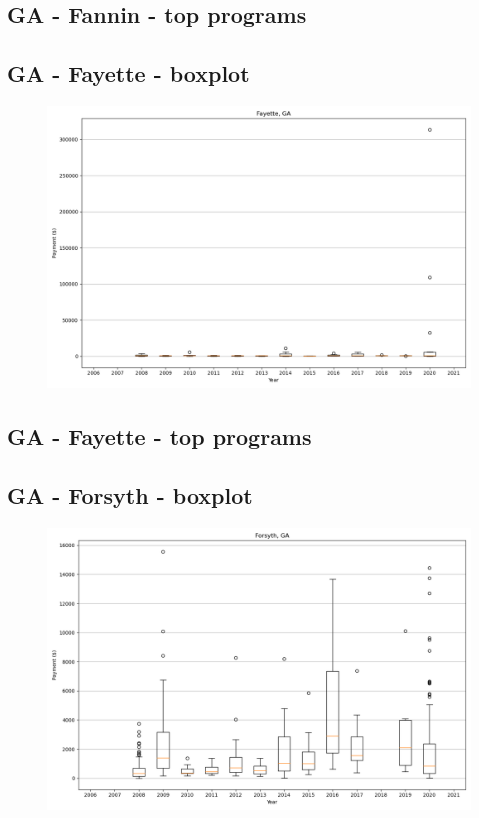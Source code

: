 \subsection*{GA - Fannin - top programs}

\newpage
\subsection*{GA - Fayette - boxplot}
\begin{figure}[h]
\centering
\includegraphics[width=7in]{../output/boxplots/counties/Fayette-GA_boxplot.png}
\end{figure}


\subsection*{GA - Fayette - top programs}

\newpage
\subsection*{GA - Forsyth - boxplot}
\begin{figure}[h]
\centering
\includegraphics[width=7in]{../output/boxplots/counties/Forsyth-GA_boxplot.png}
\end{figure}


